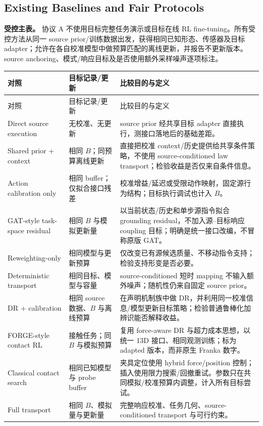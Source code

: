 \documentclass[11pt]{article}
\begin{document}
\subsection{Existing Baselines and Fair Protocols}
\textbf{受控主表。} 协议 A 不使用目标完整任务演示或目标在线 RL fine-tuning。所有受控方法从同一 source prior/训练数据出发，获得相同已知形态、传感器及目标 adapter；允许在各自校准模型中做预算匹配的离线更新，并报告不更新版本。source anchoring、模式/响应目标及是否使用额外采样噪声逐项标注。
\small
\begin{longtable}{L{2.9cm}L{2.4cm}L{6.9cm}}
\toprule
对照 & 目标记录/更新 & 比较目的与定义\\\midrule\endfirsthead
\toprule 对照 & 目标记录/更新 & 比较目的与定义\\\midrule\endhead
Direct source execution & 无校准、无更新 & source prior 经共享目标 adapter 直接执行，测接口落地后的基础差距。\\
Shared prior + context & 相同 $B$；同预算离线更新 & 直接把校准 context/历史提供给共享条件策略，不使用 source-conditioned law transport；检验收益是否仅来自条件信息。\\
Action calibration only & 相同 buffer；仅拟合接口残差 & 校准增益/延迟或受限动作映射，固定源行为结构；目标执行调试也计入 $B$。\\
GAT-style task-space residual & 相同 $B$ 与模拟更新量 & 以当前状态/历史和单步源指令拟合 grounding residual，不加入源--目标响应 coupling 目标；明确是统一接口改编，不冒称原版 GAT\cite{gat}。\\
Reweighting-only & 相同模型与更新预算 & 仅改变已有源候选质量、不移动指令支持；检验支持形变是否必要。\\
Deterministic transport & 相同目标、模型与容量 & source-conditioned 短时 mapping 不输入额外噪声；随机性仍来自固定 source prior。\\
DR + calibration & 相同 source 数据、$B$ 与离线预算 & 在声明机制族中做 DR，并利用同一校准信息/模型更新目标策略；检验普通鲁棒化加辨识能否解释收益\cite{dr}。\\
FORGE-style contact RL & 接触任务；同 $B$ 与模拟预算 & 复用 force-aware DR 与超力成本思想，以统一 13D 接口、相同观测训练；标为 adapted 版本，而非原生 Franka 数字\cite{isaaclabtasks}。\\
Classical contact search & 相同已知模型与 probe buffer & 夹具定位使用 hybrid force/position 控制；插入使用限力搜索/回撤重试。参数只在共同模拟/校准预算内调整，计入所有目标尝试。\\
Full transport & 相同 $B$、模拟量与更新量 & 完整响应校准、任务几何、source-conditioned transport 与可行约束。\\
\bottomrule
\end{longtable}
\normalsize
\end{document}
